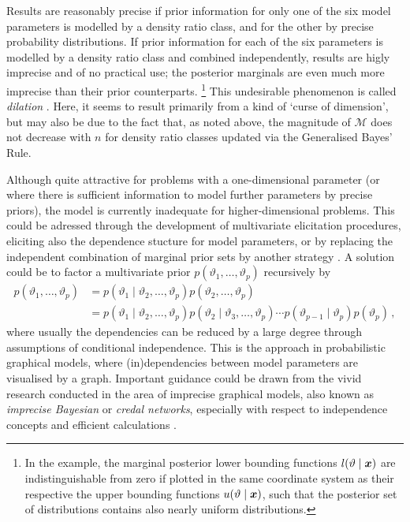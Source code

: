 Results are reasonably precise if prior information for only one of the six model parameters
is modelled by a density ratio class, and for the other by precise probability distributions.
If prior information for each of the six parameters is modelled by a density ratio class and combined independently,
results are higly imprecise and of no practical use;
the posterior marginals are even much more imprecise than their prior counterparts.%
\footnote{In the example, the marginal posterior lower bounding functions $l(\vartheta\mid{\bm x})$ are indistinguishable
from zero if plotted in the same coordinate system as their respective the upper bounding functions $u(\vartheta\mid{\bm x})$,
such that the posterior set of distributions contains also nearly uniform distributions.}
This undesirable phenomenon is called \emph{dilation} \parencite[see][]{1993:seidenfeld}.
Here, it seems to result primarily from a kind of `curse of dimension',
but may also be due to the fact that, as noted above, the magnitude of $\mathcal{M}$ does not decrease with $n$
for density ratio classes updated via the Generalised Bayes' Rule.

Although quite attractive for problems with a one-dimensional parameter
(or where there is sufficient information to model further parameters by precise priors),
the model is currently inadequate for higher-dimensional problems.
This could be adressed through the development of multivariate elicitation procedures,
eliciting also the dependence stucture for model parameters,
or by replacing the independent combination of marginal prior sets
by another strategy \parencite[as mentioned in][\S 5.2]{2011:rinderknecht:diss}.
A solution could be to factor a multivariate prior $p(\vartheta_1,\ldots,\vartheta_p)$
recursively by
\begin{align*}
p(\vartheta_1,\ldots,\vartheta_p)
 &= p(\vartheta_1\mid \vartheta_2,\ldots,\vartheta_p) p(\vartheta_2,\ldots,\vartheta_p) \\
 &= p(\vartheta_1\mid \vartheta_2,\ldots,\vartheta_p) p(\vartheta_2\mid \vartheta_3,\ldots,\vartheta_p)
    \cdots p(\vartheta_{p-1}\mid\vartheta_p) p(\vartheta_p)\,,
\end{align*}
where usually the dependencies can be reduced by a large degree through assumptions of conditional independence.
This is the approach in probabilistic graphical models,
where (in)dependencies between model parameters are visualised by a graph.
Important guidance could be drawn from the vivid research conducted in the area
of imprecise graphical models, also known as \emph{imprecise Bayesian} or \emph{credal networks},
especially with respect to independence concepts and efficient calculations
\parencite[for a recent overview, see][]{itip-ipgms}.

